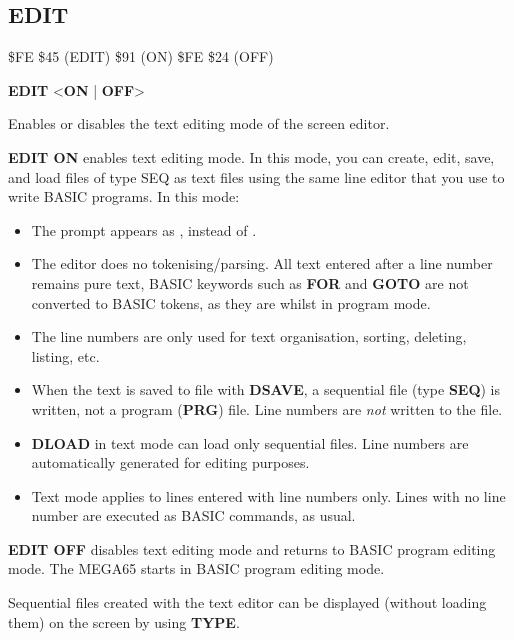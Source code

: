\subsection{EDIT}
\begin{description}[leftmargin=2cm,style=nextline]
\item [Token:]    \$FE \$45 (EDIT) \$91 (ON) \$FE \$24 (OFF)

\item [Format:]   {\bf EDIT} <{\bf ON} | {\bf OFF}>

\item [Usage:]    Enables or disables the text editing mode of the screen editor.

                  {\bf EDIT ON} enables text editing mode. In this mode, you can create, edit, save, and load files of type SEQ as text files using the same line editor that you use to write BASIC programs. In this mode:

                  \begin{itemize}
                     \item The prompt appears as , instead of .
                     \item The editor does no tokenising/parsing. All text entered after a line number remains pure text, BASIC keywords such as {\bf FOR} and {\bf GOTO} are not converted to BASIC tokens, as they are whilst in program mode.
                     \item The line numbers are only used for text organisation, sorting, deleting, listing, etc.
                     \item When the text is saved to file with {\bf DSAVE}, a sequential file (type {\bf SEQ}) is written, not a program ({\bf PRG}) file. Line numbers are {\em not} written to the file.
                     \item {\bf DLOAD} in text mode can load only sequential files. Line numbers are automatically generated for editing purposes.
                     \item Text mode applies to lines entered with line numbers only. Lines with no line number are executed as BASIC commands, as usual.
                  \end{itemize}

                  {\bf EDIT OFF} disables text editing mode and returns to BASIC program editing mode. The MEGA65 starts in BASIC program editing mode.

                  Sequential files created with the text editor can be displayed (without loading them) on the screen by using {\bf TYPE}.


\end{description}
